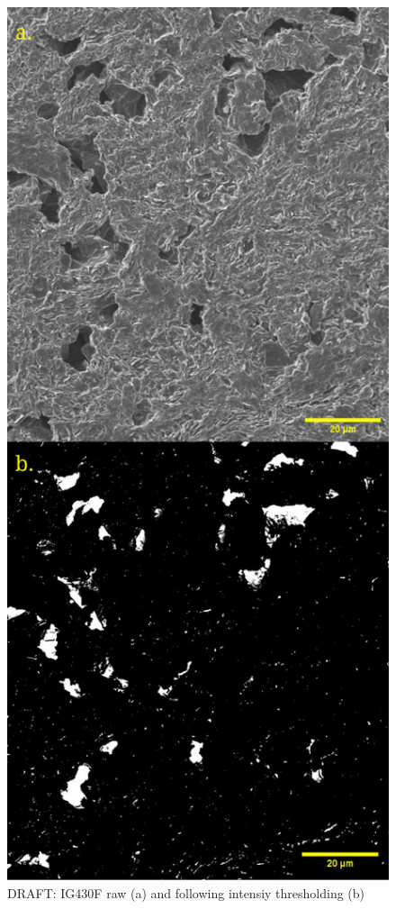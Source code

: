 \documentclass[review]{elsarticle}
\begin{document}
\begin{figure}[!htbp]
    \includegraphics[width=0.9\columnwidth]{./Media/intensitythresholdexampleig430fdual.png}
    \caption{DRAFT: IG430F raw (a) and following intensiy thresholding (b)}
    \label{fig:dualintensitythreshig430f}
\end{figure}
\end{document}
